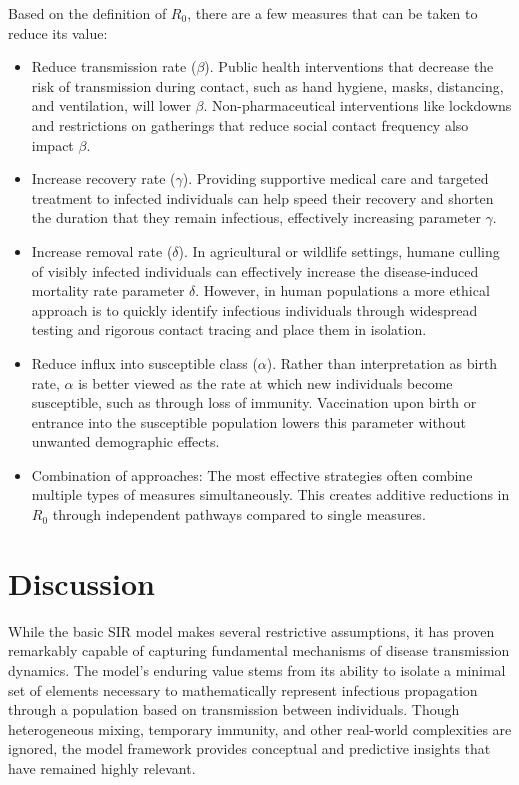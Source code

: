 Based on the definition of $R_0$, there are a few measures that can be taken to reduce its value:
\begin{itemize}
    \item Reduce transmission rate ($\beta$). Public health interventions that decrease the risk of transmission during contact, such as hand hygiene, masks, distancing, and ventilation, will lower $\beta$. Non-pharmaceutical interventions like lockdowns and restrictions on gatherings that reduce social contact frequency also impact $\beta$.
    \item Increase recovery rate ($\gamma$). Providing supportive medical care and targeted treatment to infected individuals can help speed their recovery and shorten the duration that they remain infectious, effectively increasing parameter $\gamma$.
    \item Increase removal rate ($\delta$). In agricultural or wildlife settings, humane culling of visibly infected individuals can effectively increase the disease-induced mortality rate parameter $\delta$. However, in human populations a more ethical approach is to quickly identify infectious individuals through widespread testing and rigorous contact tracing and place them in isolation.
    \item Reduce influx into susceptible class ($\alpha$). Rather than interpretation as birth rate, $\alpha$ is better viewed as the rate at which new individuals become susceptible, such as through loss of immunity. Vaccination upon birth or entrance into the susceptible population lowers this parameter without unwanted demographic effects.
    \item Combination of approaches: The most effective strategies often combine multiple types of measures simultaneously. This creates additive reductions in $R_0$ through independent pathways compared to single measures.
\end{itemize}

\section{Discussion}

While the basic SIR model makes several restrictive assumptions, it has proven remarkably capable of capturing fundamental mechanisms of disease transmission dynamics. The model's enduring value stems from its ability to isolate a minimal set of elements necessary to mathematically represent infectious propagation through a population based on transmission between individuals. Though heterogeneous mixing, temporary immunity, and other real-world complexities are ignored, the model framework provides conceptual and predictive insights that have remained highly relevant.

